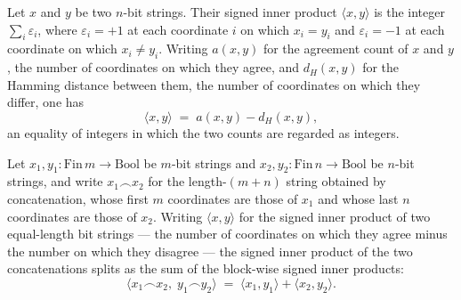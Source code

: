 \begin{theorem}
\label{CommunicationComplexity.BitString.signedInner_eq_agreementCount_sub_hammingDist}
\leanok
{}
Let $x$ and $y$ be two $n$-bit strings. Their signed inner product $\langle x, y\rangle$
is the integer $\sum_{i} \varepsilon_i$, where $\varepsilon_i = +1$ at each coordinate
$i$ on which $x_i = y_i$ and $\varepsilon_i = -1$ at each coordinate on which $x_i \neq
y_i$. Writing $a(x,y)$ for the agreement count of $x$ and $y$, the number of coordinates
on which they agree, and $d_H(x,y)$ for the Hamming distance between them, the number of
coordinates on which they differ, one has
\[
  \langle x, y\rangle \;=\; a(x,y) - d_H(x,y),
\]
an equality of integers in which the two counts are regarded as integers.
\end{theorem}

\begin{theorem}
\label{CommunicationComplexity.BitString.signedInner_append}
\leanok
{}
Let $x_1, y_1 : \mathrm{Fin}\,m \to \mathrm{Bool}$ be $m$-bit strings and $x_2, y_2 :
\mathrm{Fin}\,n \to \mathrm{Bool}$ be $n$-bit strings, and write $x_1 \frown x_2$ for
the length-$(m+n)$ string obtained by concatenation, whose first $m$ coordinates are
those of $x_1$ and whose last $n$ coordinates are those of $x_2$. Writing $\langle x,
y\rangle$ for the signed inner product of two equal-length bit strings — the number of
coordinates on which they agree minus the number on which they disagree — the signed
inner product of the two concatenations splits as the sum of the block-wise signed inner
products:
\[
  \langle x_1 \frown x_2,\; y_1 \frown y_2\rangle
  \;=\; \langle x_1, y_1\rangle + \langle x_2, y_2\rangle.
\]
\end{theorem}


